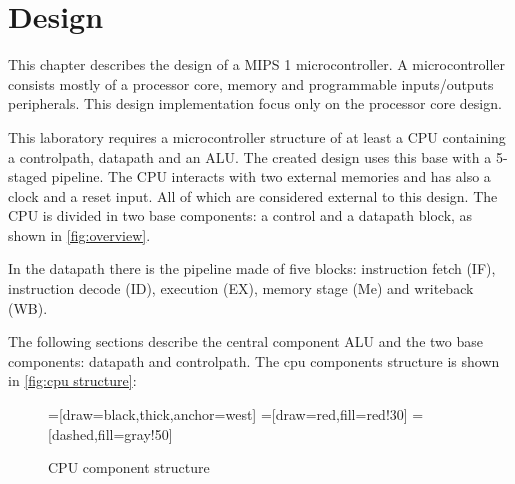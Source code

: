\chapter{Design}
This chapter describes the design of a MIPS 1 microcontroller. A microcontroller consists mostly of a processor core, memory and programmable inputs/outputs peripherals. 
This design implementation focus only on the processor core design.

This laboratory requires a microcontroller structure of at least a CPU containing a controlpath, datapath and an ALU. The created design uses this base with a 5-staged pipeline.
The CPU interacts with two external memories and has also a clock and a reset input. All of which are considered external to this design.
The CPU is divided in two base components: a control and a datapath block, as shown  in \autoref{fig:overview}.

\begin{figure}[h]
\end{figure} 

In the datapath there is the pipeline made of five blocks: instruction fetch (IF), instruction decode (ID), execution (EX), memory stage (Me) and writeback (WB).

The following sections describe the central component ALU and the two base components: datapath and controlpath.
The cpu components structure is shown in \autoref{fig:cpu structure}:
\begin{figure}[h!]
\begin{center}
 =[draw=black,thick,anchor=west]
=[draw=red,fill=red!30]
=[dashed,fill=gray!50]
\caption{CPU component structure}
\label{fig:cpu structure}
\end{center}
\end{figure}

	
	
	
	